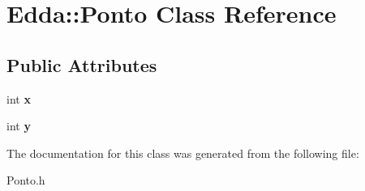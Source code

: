 \hypertarget{class_edda_1_1_ponto}{
\section{Edda::Ponto Class Reference}
\label{class_edda_1_1_ponto}
}
\subsection*{Public Attributes}
\begin{DoxyCompactItemize}
\item 
\hypertarget{class_edda_1_1_ponto_a77cec99be4d79bca1c232ebdd0a3afaf}{
int {\bfseries x}}
\label{class_edda_1_1_ponto_a77cec99be4d79bca1c232ebdd0a3afaf}

\item 
\hypertarget{class_edda_1_1_ponto_abb863b3863008d810f9bf2b3aa1c055c}{
int {\bfseries y}}
\label{class_edda_1_1_ponto_abb863b3863008d810f9bf2b3aa1c055c}

\end{DoxyCompactItemize}


The documentation for this class was generated from the following file:\begin{DoxyCompactItemize}
\item 
Ponto.h\end{DoxyCompactItemize}
